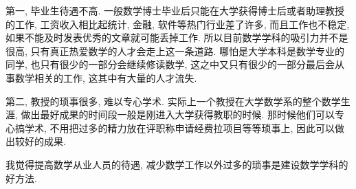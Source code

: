 第一, 毕业生待遇不高. 一般数学博士毕业后只能在大学获得博士后或者助理教授的工作, 工资收入相比起统计, 金融, 软件等热门行业差了许多, 而且工作也不稳定, 如果不能及时发表优秀的文章就可能丢掉工作. 所以目前数学学科的吸引力并不是很高, 只有真正热爱数学的人才会走上这一条道路. 哪怕是大学本科是数学专业的同学, 也只有很少的一部分会继续修读数学, 这之中又只有很少的一部分最后会从事数学相关的工作, 这其中有大量的人才流失.

第二, 教授的琐事很多, 难以专心学术. 实际上一个教授在大学数学系的整个数学生涯, 做出最好成果的时间段一般是刚进入大学获得教职的时候. 那时候他们可以专心搞学术, 不用把过多的精力放在评职称申请经费拉项目等等琐事上, 因此可以做出较好的成果.

我觉得提高数学从业人员的待遇, 减少数学工作以外过多的琐事是建设数学学科的好方法.
